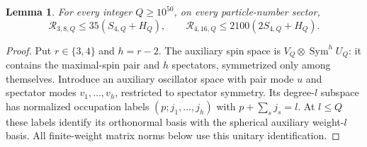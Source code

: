 \documentclass[11pt]{article}
\newtheorem{lemma}{Lemma}
\newcommand{\Sym}{\operatorname{Sym}}
\begin{document}
\begin{lemma}\label{lem:explicit-coherent-threshold}
For every integer $Q\ge10^{50}$, on every particle-number sector,
\begin{equation}
 \mathcal R_{3,8,Q}\le35(S_{4,Q}+H_Q),\qquad
 \mathcal R_{4,16,Q}\le2100(2S_{4,Q}+H_Q).
\end{equation}
\end{lemma}
\begin{proof}
Put $r\in\{3,4\}$ and $h=r-2$. The auxiliary spin space is
$V_Q\otimes\Sym^hU_Q$: it contains the maximal-spin pair and $h$
spectators, symmetrized only among themselves. Introduce an auxiliary
oscillator space with pair mode $u$ and spectator modes
$v_1,\ldots,v_h$, restricted to spectator symmetry. Its degree-$l$
subspace has normalized occupation labels $(p;j_1,\ldots,j_h)$ with
$p+\sum_sj_s=l$. At $l\le Q$ these labels identify its orthonormal basis
with the spherical auxiliary weight-$l$ basis. All finite-weight matrix
norms below use this unitary identification.


\end{proof}
\end{document}

